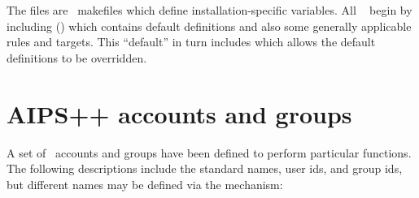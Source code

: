 The  files are \gnu\ makefiles which define
installation-specific variables.  All \aipspp\  begin by
including  () which
contains default definitions and also some generally applicable rules and
targets.  This ``default''  in turn includes
 which allows the default definitions to be
overridden.


\section{AIPS++ accounts and groups}
\label{Accounts and groups}



A set of \aipspp\ accounts and groups have been defined to perform particular
functions.  The following descriptions include the standard names, user ids,
and group ids, but different names may be defined via the 
mechanism:

